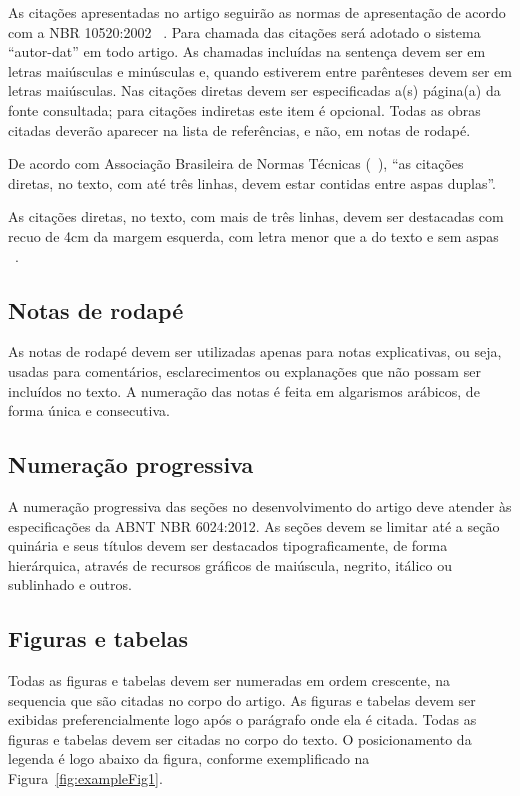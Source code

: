 \documentclass[article,a4paper,12pt,brazil,sumario=tradicional]{abntex2}
\renewenvironment{quotation}
  {\small\list{}{\rightmargin=0cm \leftmargin=2cm}%
   \item\relax}
  {\endlist}
\begin{document}
As citações apresentadas no artigo seguirão as normas de apresentação de acordo com a NBR 10520:2002 ~\cite{bibliografica6023}. Para chamada das citações será adotado o sistema ``autor-dat'' em todo artigo. As chamadas incluídas na sentença devem ser em letras maiúsculas e minúsculas e, quando estiverem entre parênteses devem ser em letras maiúsculas. Nas citações diretas devem ser especificadas a(s) página(a) da fonte consultada; para citações indiretas este item é opcional. Todas as obras citadas deverão aparecer na lista de referências, e não, em notas de rodapé.

De acordo com Associação Brasileira de Normas Técnicas (~\citeyear{bibliografica6023}), ``as citações diretas, no texto, com até três linhas, devem estar contidas entre aspas duplas''.

\begin{quotation}
\noindent
As citações diretas, no texto, com mais de três linhas, devem ser destacadas com recuo de 4cm da margem esquerda, com letra menor que a do texto e sem aspas ~\cite{bibliografica6023}.
\end{quotation}

\subsection{Notas de rodapé}

As notas de rodapé devem ser utilizadas apenas para notas explicativas, ou seja, usadas para comentários, esclarecimentos ou explanações que não possam ser incluídos no texto. A numeração das notas é feita em algarismos arábicos, de forma única e consecutiva.

\subsection{Numeração progressiva}

A numeração progressiva das seções no desenvolvimento do artigo deve atender às especificações da ABNT NBR 6024:2012. As seções devem se limitar até a seção quinária e seus títulos devem ser destacados tipograficamente, de forma hierárquica, através de recursos gráficos de maiúscula, negrito, itálico ou sublinhado e outros.

\subsection{Figuras e tabelas}

Todas as figuras e tabelas devem ser numeradas em ordem crescente, na sequencia que são citadas no corpo do artigo. As figuras e tabelas devem ser exibidas preferencialmente logo após o parágrafo onde ela é citada. Todas as figuras e tabelas devem ser citadas no corpo do texto. O posicionamento da legenda é logo abaixo da figura, conforme exemplificado na Figura~\ref{fig:exampleFig1}.
\end{document}

